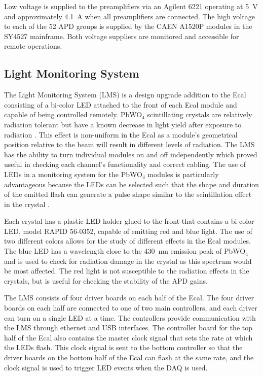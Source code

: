 \documentclass[12pt]{report}
\begin{document}
Low voltage is supplied to the preamplifiers via an Agilent 6221 operating at 5~V and approximately 4.1~A when all preamplifiers are connected. The high voltage to each of the 52 APD groups is supplied by the CAEN A1520P modules in the SY4527 mainframe. Both voltage suppliers are monitored and accessible for remote operations.  

\subsection{Light Monitoring System}

The Light Monitoring System (LMS) is a design upgrade addition to the Ecal consisting of a bi-color LED attached to the front of each Ecal module and capable of being controlled remotely. PbWO$_4$ scintillating crystals are relatively radiation tolerant but have a known decrease in light yield after exposure to radiation \cite{Batarin}. This effect is non-uniform in the Ecal as a module's geometrical position relative to the beam will result in different levels of radiation. The LMS has the ability to turn individual modules on and off independently which proved useful in checking each channel's functionality and correct cabling. The use of LEDs in a monitoring system for the PbWO$_4$ modules is particularly advantageous because the LEDs can be selected such that the shape and duration of the emitted flash can generate a pulse shape similar to the scintillation effect in the crystal \cite{Battaglieri}.

Each crystal has a plastic LED holder glued to the front that contains a bi-color LED, model RAPID 56-0352, capable of emitting red and blue light. The use of two different colors allows for the study of different effects in the Ecal modules. The blue LED has a wavelength close to the 430~nm emission peak of PbWO$_4$  \cite{Battaglieri} and is used to check for radiation damage in the crystal as this spectrum would be most affected. The red light is not susceptible to the radiation effects in the crystals, but is useful for checking the stability of the  APD gains. 

The LMS consists of four driver boards on each half of the Ecal. The four driver boards on each half are connected to one of two main controllers, and each driver can turn on a single LED at a time. The controllers provide communication with the LMS through ethernet and USB interfaces. The controller board for the top half of the Ecal also contains the master clock signal that sets the rate at which the LEDs flash. This clock signal is sent to the bottom controller so that the driver boards on the bottom half of the Ecal can flash at the same rate, and the clock signal is used to trigger LED events when the DAQ is used. 
\end{document}
